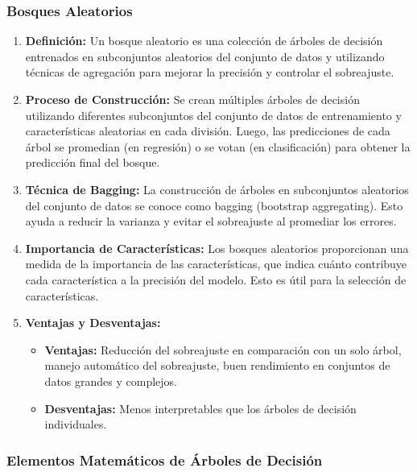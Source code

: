 \documentclass{book}
\begin{document}
\subsubsection{Bosques Aleatorios}

\begin{enumerate}
    \item \textbf{Definición:}
        Un bosque aleatorio es una colección de árboles de decisión entrenados en subconjuntos aleatorios del conjunto de datos y utilizando técnicas de agregación para mejorar la precisión y controlar el sobreajuste.

    \item \textbf{Proceso de Construcción:}
        Se crean múltiples árboles de decisión utilizando diferentes subconjuntos del conjunto de datos de entrenamiento y características aleatorias en cada división. Luego, las predicciones de cada árbol se promedian (en regresión) o se votan (en clasificación) para obtener la predicción final del bosque.

    \item \textbf{Técnica de Bagging:}
        La construcción de árboles en subconjuntos aleatorios del conjunto de datos se conoce como bagging (bootstrap aggregating). Esto ayuda a reducir la varianza y evitar el sobreajuste al promediar los errores.

    \item \textbf{Importancia de Características:}
        Los bosques aleatorios proporcionan una medida de la importancia de las características, que indica cuánto contribuye cada característica a la precisión del modelo. Esto es útil para la selección de características.

    \item \textbf{Ventajas y Desventajas:}
        \begin{itemize}
            \item \textbf{Ventajas:} Reducción del sobreajuste en comparación con un solo árbol, manejo automático del sobreajuste, buen rendimiento en conjuntos de datos grandes y complejos.
            \item \textbf{Desventajas:} Menos interpretables que los árboles de decisión individuales.
        \end{itemize}
\end{enumerate}

\subsubsection{Elementos Matemáticos de Árboles de Decisión}
\end{document}

